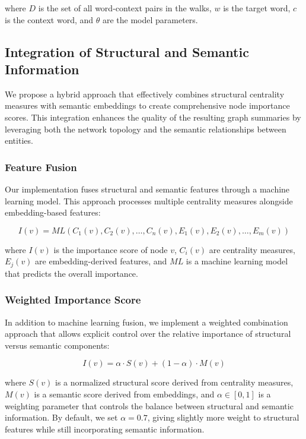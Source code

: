 \documentclass[article,submit,pdftex,moreauthors]{Definitions/mdpi}
\begin{document}
where $D$ is the set of all word-context pairs in the walks, $w$ is the target word, $c$ is the context word, and $\theta$ are the model parameters.

\subsection{Integration of Structural and Semantic Information}
We propose a hybrid approach that effectively combines structural centrality measures with semantic embeddings to create comprehensive node importance scores. This integration enhances the quality of the resulting graph summaries by leveraging both the network topology and the semantic relationships between entities.

\subsubsection{Feature Fusion}
Our implementation fuses structural and semantic features through a machine learning model. This approach processes multiple centrality measures alongside embedding-based features:

\begin{equation}
    I(v) = ML(C_1(v), C_2(v), \ldots, C_n(v), E_1(v), E_2(v), \ldots, E_m(v))
\end{equation}

where $I(v)$ is the importance score of node $v$, $C_i(v)$ are centrality measures, $E_j(v)$ are embedding-derived features, and $ML$ is a machine learning model that predicts the overall importance.

\subsubsection{Weighted Importance Score}
In addition to machine learning fusion, we implement a weighted combination approach that allows explicit control over the relative importance of structural versus semantic components:

\begin{equation}
    I(v) = \alpha \cdot S(v) + (1-\alpha) \cdot M(v)
\end{equation}

where $S(v)$ is a normalized structural score derived from centrality measures, $M(v)$ is a semantic score derived from embeddings, and $\alpha \in [0,1]$ is a weighting parameter that controls the balance between structural and semantic information. By default, we set $\alpha = 0.7$, giving slightly more weight to structural features while still incorporating semantic information.
\end{document}
